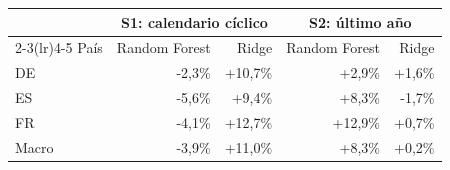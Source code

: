 \begin{tabular}{lrrrr}
\toprule
 & \multicolumn{2}{c}{S1: calendario cíclico} & \multicolumn{2}{c}{S2: último año} \\
\cmidrule(lr){2-3}\cmidrule(lr){4-5}
País & Random Forest & Ridge & Random Forest & Ridge \\
\midrule
DE & -2{,}3\% & +10{,}7\% & +2{,}9\% & +1{,}6\% \\
ES & -5{,}6\% & +9{,}4\% & +8{,}3\% & -1{,}7\% \\
FR & -4{,}1\% & +12{,}7\% & +12{,}9\% & +0{,}7\% \\
\midrule
Macro & -3{,}9\% & +11{,}0\% & +8{,}3\% & +0{,}2\% \\
\bottomrule
\end{tabular}
